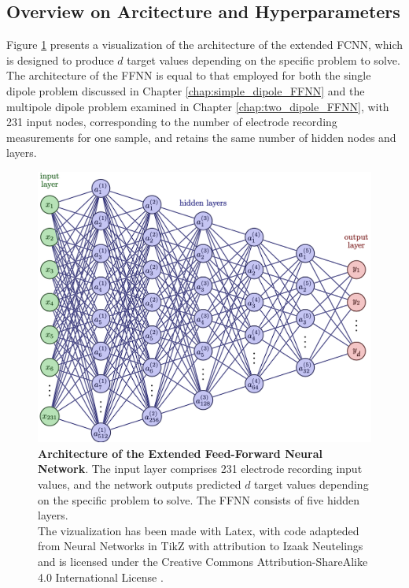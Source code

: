 \documentclass[a4paper, UKenglish, 11pt]{uiomaster}
\begin{document}
\subsection{Overview on Arcitecture and Hyperparameters}
Figure \ref{fig:NN_dipole_w_amplitude_architecture} presents a visualization of the architecture of the extended FCNN, which is designed to produce $d$ target values depending on the specific problem to solve. The architecture of the FFNN is equal to that employed for both the single dipole problem discussed in Chapter \ref{chap:simple_dipole_FFNN} and the multipole dipole problem examined in Chapter \ref{chap:two_dipole_FFNN}, with 231 input nodes, corresponding to the number of electrode recording measurements for one sample, and retains the same number of hidden nodes and layers.

\begin{figure}[!htb]
    \centering
    \includegraphics[width=\linewidth]{figures/NN_multiple_outputs.png}
    \caption{\textbf{Architecture of the Extended Feed-Forward Neural Network}. The input layer comprises 231 electrode recording input values, and the network outputs predicted $d$ target values depending on the specific problem to solve. The FFNN consists of five hidden layers. \\
    The vizualization has been made with Latex, with code adapteded from Neural Networks in TikZ with attribution to Izaak Neutelings and is licensed under the Creative Commons Attribution-ShareAlike 4.0 International License \cite{neutelings2021}.}
    \label{fig:NN_dipole_w_amplitude_architecture}
\end{figure}
\end{document}
